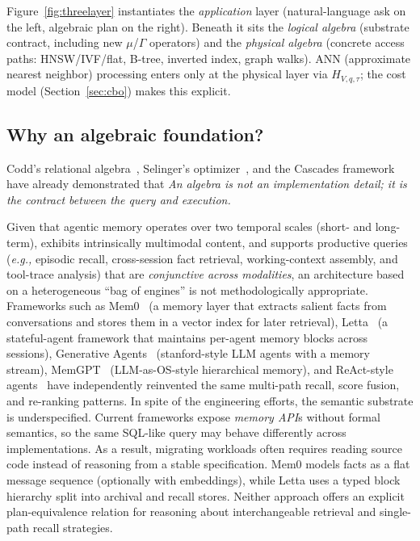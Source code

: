 \documentclass[sigconf]{acmart}
\theoremstyle{plain}
\theoremstyle{definition}
\newcommand{\eg}{\emph{e.g.,}\xspace}
\theoremstyle{remark}
\begin{document}
Figure~\ref{fig:threelayer} instantiates the \emph{application} layer (natural-language ask on the left, algebraic plan on the right). Beneath it sits the \emph{logical algebra} (substrate contract, including new $\mu$/$\Gamma$ operators) and the \emph{physical algebra} (concrete access paths: HNSW/IVF/flat, B-tree, inverted index, graph walks). ANN (approximate nearest neighbor) processing enters only at the physical layer via $H_{V,q,\tau}$; the cost model (Section~\ref{sec:cbo}) makes this explicit.

\subsection{Why an algebraic foundation?}\label{sec:intro:algebra}

Codd's relational algebra~\cite{codd1970}, Selinger's optimizer~\cite{selinger1979}, and the Cascades framework~\cite{graefe1994,graefe1995} have already demonstrated that \textit{An algebra is not an implementation detail; it is the contract between the query and execution.}

Given that agentic memory operates over two temporal scales (short- and long-term), exhibits intrinsically multimodal content, and supports productive queries (\eg episodic recall, cross-session fact retrieval, working-context assembly, and tool-trace analysis) that are \emph{conjunctive across modalities}, an architecture based on a heterogeneous ``bag of engines'' is not methodologically appropriate. Frameworks such as Mem0~\cite{mem0} (a memory layer that extracts salient facts from conversations and stores them in a vector index for later retrieval), Letta~\cite{letta} (a stateful-agent framework that maintains per-agent memory blocks across sessions), Generative Agents~\cite{park2023generative} (stanford-style LLM agents with a memory stream), MemGPT~\cite{packer2024memgpt} (LLM-as-OS-style hierarchical memory), and ReAct-style agents~\cite{yao2022react} have independently reinvented the same multi-path recall, score fusion, and re-ranking patterns. In spite of the engineering efforts, the semantic substrate is underspecified. Current frameworks expose \emph{memory API}s without formal semantics, so the same SQL-like query may behave differently across implementations. As a result, migrating workloads often requires reading source code instead of reasoning from a stable specification. Mem0 models facts as a flat message sequence (optionally with embeddings), while Letta uses a typed block hierarchy split into archival and recall stores. Neither approach offers an explicit plan-equivalence relation for reasoning about interchangeable retrieval and single-path recall strategies.
\end{document}

